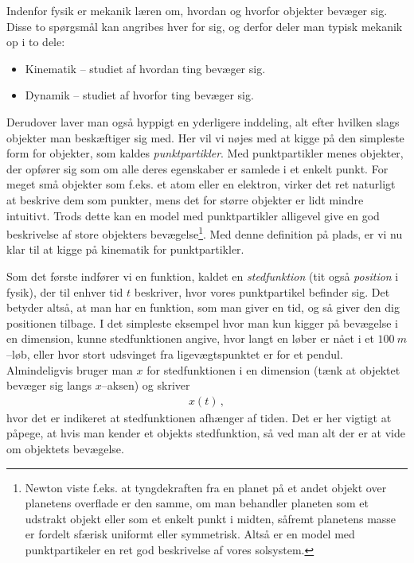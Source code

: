 
Indenfor fysik er mekanik læren om, hvordan og hvorfor objekter bevæger sig. Disse to spørgsmål kan angribes hver for sig, og derfor deler man typisk mekanik op i to dele:
\begin{itemize}
\item Kinematik -- studiet af hvordan ting bevæger sig.
\item Dynamik -- studiet af hvorfor ting bevæger sig.
\end{itemize}
Derudover laver man også hyppigt en yderligere inddeling, alt efter hvilken slags objekter man beskæftiger sig med. Her vil vi nøjes med at kigge på den simpleste form for objekter, som kaldes \emph{punktpartikler}. Med punktpartikler menes objekter, der opfører sig som om alle deres egenskaber er samlede i et enkelt punkt. For meget små objekter som f.eks. et atom eller en elektron, virker det ret naturligt at beskrive dem som punkter, mens det for større objekter er lidt mindre intuitivt. Trods dette kan en model med punktpartikler alligevel give en god beskrivelse af store objekters bevægelse\footnote{Newton viste f.eks. at tyngdekraften fra en planet på et andet objekt over planetens overflade er den samme, om man behandler planeten som et udstrakt objekt eller som et enkelt punkt i midten, såfremt planetens masse er fordelt sfærisk uniformt eller symmetrisk. Altså er en model med punktpartikeler en ret god beskrivelse af vores solsystem.}. Med denne definition på plads, er vi nu klar til at kigge på kinematik for punktpartikler. 

Som det første indfører vi en funktion, kaldet en \emph{stedfunktion} (tit også \emph{position} i fysik), der til enhver tid $t$ beskriver, hvor vores punktpartikel befinder sig. Det betyder altså, at man har en funktion, som man giver en tid, og så giver den dig positionen tilbage. I det simpleste eksempel hvor man kun kigger på bevægelse i en dimension, kunne stedfunktionen angive, hvor langt en løber er nået i et $\SI{100}{m}$--løb, eller hvor stort udsvinget fra ligevægtspunktet er for et pendul. Almindeligvis bruger man $x$ for stedfunktionen i en dimension (tænk at objektet bevæger sig langs $x$--aksen) og skriver
\begin{align}
x(t) \, ,
\end{align}
hvor det er indikeret at stedfunktionen afhænger af tiden. Det er her vigtigt at påpege, at hvis man kender et objekts stedfunktion, så ved man alt der er at vide om objektets bevægelse.

